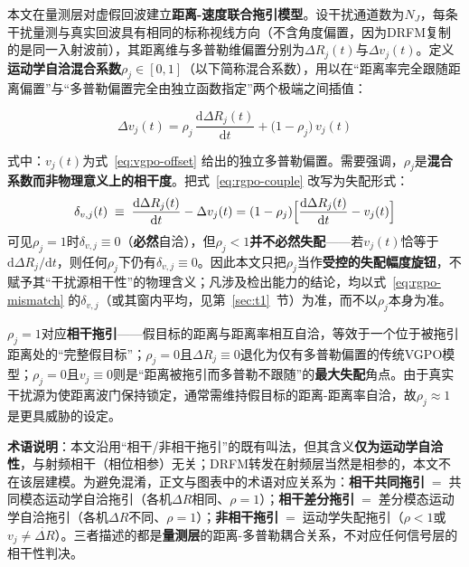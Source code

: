 \documentclass[UTF8,a4paper,zihao=-4]{ctexart}
\begin{document}
本文在量测层对虚假回波建立\textbf{距离-速度联合拖引模型}。设干扰通道数为\(N_J\)，每条干扰量测与真实回波具有相同的标称视线方向（不含角度偏置，因为DRFM复制的是同一入射波前），其距离维与多普勒维偏置分别为\(\Delta R_j(t)\)与\(\Delta v_j(t)\)。定义\textbf{运动学自洽混合系数}\(\rho_j\in[0,1]\)（以下简称混合系数），用以在“距离率完全跟随距离偏置”与“多普勒偏置完全由独立函数指定”两个极端之间插值：


\begin{equation}
\Delta v_j(t)=\rho_j\,\frac{\mathrm{d}\Delta R_j(t)}{\mathrm{d}t}+\bigl(1-\rho_j\bigr)\,v_j(t)
\label{eq:rgpo-couple}
\end{equation}


式中：\(v_j(t)\)为式~\eqref{eq:vgpo-offset} 给出的独立多普勒偏置。需要强调，\(\rho_j\)是\textbf{混合系数而非物理意义上的相干度}。把式~\eqref{eq:rgpo-couple} 改写为失配形式：
\begin{equation}
\delta_{v,j}(t)\;\equiv\;\frac{\mathrm{d}\Delta R_j(t)}{\mathrm{d}t}-\Delta v_j(t)
=(1-\rho_j)\Bigl[\frac{\mathrm{d}\Delta R_j(t)}{\mathrm{d}t}-v_j(t)\Bigr]
\label{eq:rgpo-mismatch}
\end{equation}
可见\(\rho_j=1\)时\(\delta_{v,j}\equiv0\)（\textbf{必然}自洽），但\(\rho_j<1\)\textbf{并不必然失配}——若\(v_j(t)\)恰等于\(\mathrm{d}\Delta R_j/\mathrm{d}t\)，则任何\(\rho_j\)下仍有\(\delta_{v,j}\equiv0\)。因此本文只把\(\rho_j\)当作\textbf{受控的失配幅度旋钮}，不赋予其“干扰源相干性”的物理含义；凡涉及检出能力的结论，均以式~\eqref{eq:rgpo-mismatch} 的\(\delta_{v,j}\)（或其窗内平均，见第~\ref{sec:t1}~节）为准，而不以\(\rho_j\)本身为准。

\(\rho_j=1\)对应\textbf{相干拖引}——假目标的距离与距离率相互自洽，等效于一个位于被拖引距离处的“完整假目标”；\(\rho_j=0\)且\(\Delta R_j\equiv0\)退化为仅有多普勒偏置的传统VGPO模型；\(\rho_j=0\)且\(v_j\equiv0\)则是“距离被拖引而多普勒不跟随”的\textbf{最大失配}角点。由于真实干扰源为使距离波门保持锁定，通常需维持假目标的距离-距离率自洽，故\(\rho_j\approx1\)是更具威胁的设定。

\textbf{术语说明}：本文沿用“相干/非相干拖引”的既有叫法，但其含义\textbf{仅为运动学自洽性}，与射频相干（相位相参）无关；DRFM转发在射频层当然是相参的，本文不在该层建模。为避免混淆，正文与图表中的术语对应关系为：\textbf{相干共同拖引}$\;=\;$共同模态运动学自洽拖引（各机\(\Delta R\)相同、\(\rho=1\)）；\textbf{相干差分拖引}$\;=\;$差分模态运动学自洽拖引（各机\(\Delta R\)不同、\(\rho=1\)）；\textbf{非相干拖引}$\;=\;$运动学失配拖引（\(\rho<1\)或\(v_j\neq\dot{\Delta R}\)）。三者描述的都是\textbf{量测层}的距离-多普勒耦合关系，不对应任何信号层的相干性判决。
\end{document}
